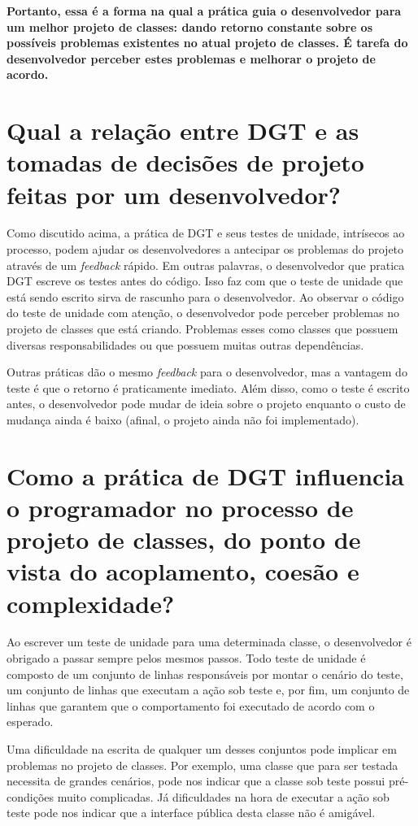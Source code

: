 \textbf{Portanto, essa é a forma na qual a prática guia o desenvolvedor para
um melhor projeto de classes: dando retorno constante sobre os possíveis problemas
existentes no atual projeto de classes. É tarefa do desenvolvedor perceber
estes problemas e melhorar o projeto de acordo.}

\section{Qual a relação entre DGT e as tomadas de decisões de projeto
feitas por um desenvolvedor?}

Como discutido acima, a prática de DGT e seus
testes de unidade, intrísecos ao processo, podem ajudar os desenvolvedores a antecipar
os problemas do projeto através de um \textit{feedback} rápido.
Em outras palavras, o desenvolvedor que pratica DGT escreve os testes antes do código.
Isso faz com que o teste de unidade que está sendo escrito sirva de
rascunho para o desenvolvedor. Ao observar o código do teste de unidade com atenção,
o desenvolvedor pode perceber problemas no projeto de classes que está criando.
Problemas esses como classes que possuem diversas responsabilidades
ou que possuem muitas outras dependências. 

Outras práticas dão o mesmo \textit{feedback}
para o desenvolvedor, mas a vantagem do teste é que o retorno é praticamente imediato.
Além disso, como o teste é escrito antes, o desenvolvedor pode mudar de ideia sobre
o projeto enquanto o custo de mudança ainda é baixo (afinal, o projeto ainda não
foi implementado).

\section{Como a prática de DGT influencia o programador no processo de  
projeto de classes, do ponto de vista do acoplamento, coesão e complexidade?}

Ao escrever um teste de unidade para uma determinada classe, o desenvolvedor
é obrigado a passar sempre pelos mesmos passos. Todo teste de unidade é composto
de um conjunto de linhas responsáveis por montar o cenário do teste, um conjunto
de linhas que executam a ação sob teste e, por fim, um conjunto de linhas que
garantem que o comportamento foi executado de acordo com o esperado.

Uma dificuldade na escrita de qualquer um desses conjuntos pode implicar
em problemas no projeto de classes. Por exemplo, uma classe que para
ser testada necessita de grandes cenários, pode nos indicar que a classe
sob teste possui pré-condições muito complicadas. Já dificuldades na hora
de executar a ação sob teste pode nos indicar que a interface pública desta
classe não é amigável. 

